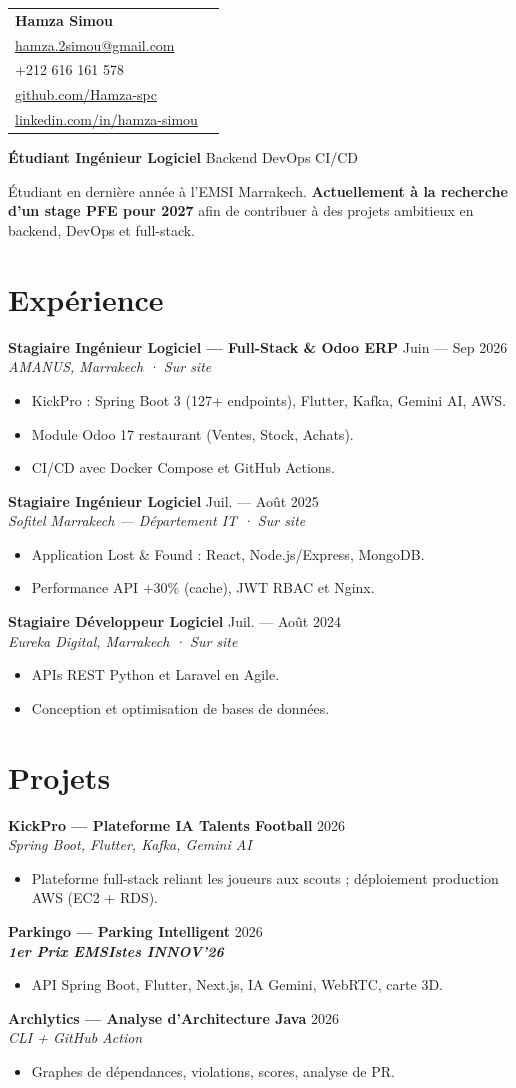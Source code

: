 \documentclass[10.5pt,a4paper]{article}
\newcommand{\role}[4]{%
  \textbf{#1} \hfill {\color{muted}\small #2}\\[-2pt]
  {\color{teal}\textit{#3}}\\[-2pt]
  \begin{itemize}[leftmargin=12pt, nosep, topsep=2pt]
    #4
  \end{itemize}
  \vspace{4pt}
}
\begin{document}
\begin{tabularx}{\textwidth}{@{}X r@{}}
  {\LARGE\bfseries\color{purple} Hamza Simou} &
  \begin{minipage}[t]{0.42\textwidth}\raggedleft\small
    Marrakech, Maroc\\
    \href{mailto:hamza.2simou@gmail.com}{hamza.2simou@gmail.com}\\
    +212 616 161 578\\
    \href{https://github.com/Hamza-spc}{github.com/Hamza-spc}\\
    \href{https://www.linkedin.com/in/hamza-simou-88977a25b/}{linkedin.com/in/hamza-simou}
  \end{minipage}
\end{tabularx}

\vspace{2pt}
{\color{teal}\textbf{Étudiant Ingénieur Logiciel}} \textbar{} Backend \textbar{} DevOps \textbar{} CI/CD

\vspace{4pt}
\small Étudiant en dernière année à l'EMSI Marrakech. \textbf{Actuellement à la recherche d'un stage PFE pour 2027} afin de contribuer à des projets ambitieux en backend, DevOps et full-stack.

\section{Expérience}
\role{Stagiaire Ingénieur Logiciel — Full-Stack \& Odoo ERP}{Juin — Sep 2026}{AMANUS, Marrakech · Sur site}{
  \item KickPro : Spring Boot 3 (127+ endpoints), Flutter, Kafka, Gemini AI, AWS.
  \item Module Odoo 17 restaurant (Ventes, Stock, Achats).
  \item CI/CD avec Docker Compose et GitHub Actions.
}
\role{Stagiaire Ingénieur Logiciel}{Juil. — Août 2025}{Sofitel Marrakech — Département IT · Sur site}{
  \item Application Lost \& Found : React, Node.js/Express, MongoDB.
  \item Performance API +30\% (cache), JWT RBAC et Nginx.
}
\role{Stagiaire Développeur Logiciel}{Juil. — Août 2024}{Eureka Digital, Marrakech · Sur site}{
  \item APIs REST Python et Laravel en Agile.
  \item Conception et optimisation de bases de données.
}

\section{Projets}
\role{KickPro — Plateforme IA Talents Football}{2026}{Spring Boot, Flutter, Kafka, Gemini AI}{
  \item Plateforme full-stack reliant les joueurs aux scouts ; déploiement production AWS (EC2 + RDS).
}
\role{Parkingo — Parking Intelligent}{2026}{\textbf{1er Prix EMSIstes INNOV'26}}{
  \item API Spring Boot, Flutter, Next.js, IA Gemini, WebRTC, carte 3D.
}
\role{Archlytics — Analyse d'Architecture Java}{2026}{CLI + GitHub Action}{
  \item Graphes de dépendances, violations, scores, analyse de PR.
}
\end{document}
